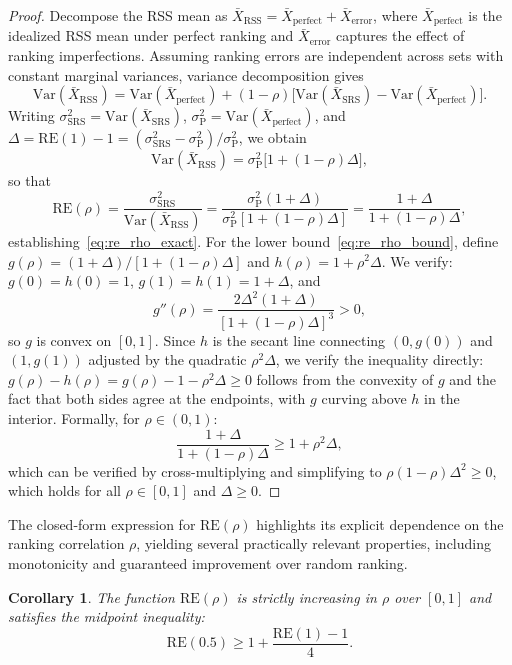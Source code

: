 \documentclass[12pt]{article}
\newtheorem{corollary}{Corollary}[section]
\begin{document}
\begin{proof}
Decompose the RSS mean as
$\bar{X}_{\mathrm{RSS}} = \bar{X}_{\mathrm{perfect}} + \bar{X}_{\mathrm{error}}$,
where $\bar{X}_{\mathrm{perfect}}$ is the idealized RSS mean under perfect ranking and $\bar{X}_{\mathrm{error}}$ captures the effect of ranking imperfections. Assuming ranking errors are independent across sets with constant marginal variances, variance decomposition gives
\[
\mathrm{Var}(\bar{X}_{\mathrm{RSS}}) = \mathrm{Var}(\bar{X}_{\mathrm{perfect}}) + (1 - \rho)\bigl[\mathrm{Var}(\bar{X}_{\mathrm{SRS}}) - \mathrm{Var}(\bar{X}_{\mathrm{perfect}})\bigr].
\]
Writing $\sigma^2_{\mathrm{SRS}} = \mathrm{Var}(\bar{X}_{\mathrm{SRS}})$, $\sigma^2_{\mathrm{P}} = \mathrm{Var}(\bar{X}_{\mathrm{perfect}})$, and $\Delta = \mathrm{RE}(1) - 1 = (\sigma^2_{\mathrm{SRS}} - \sigma^2_{\mathrm{P}})/\sigma^2_{\mathrm{P}}$, we obtain
\[
\mathrm{Var}(\bar{X}_{\mathrm{RSS}}) = \sigma^2_{\mathrm{P}}\bigl[1 + (1 - \rho)\Delta\bigr],
\]
so that
\[
\mathrm{RE}(\rho) = \frac{\sigma^2_{\mathrm{SRS}}}{\mathrm{Var}(\bar{X}_{\mathrm{RSS}})} = \frac{\sigma^2_{\mathrm{P}}(1 + \Delta)}{\sigma^2_{\mathrm{P}}[1 + (1 - \rho)\Delta]} = \frac{1 + \Delta}{1 + (1 - \rho)\Delta},
\]
establishing~\eqref{eq:re_rho_exact}. For the lower bound~\eqref{eq:re_rho_bound}, define $g(\rho) = (1+\Delta)/[1+(1-\rho)\Delta]$ and $h(\rho) = 1 + \rho^2\Delta$. We verify: $g(0) = h(0) = 1$, $g(1) = h(1) = 1 + \Delta$, and
\[
g''(\rho) = \frac{2\Delta^2(1+\Delta)}{[1+(1-\rho)\Delta]^3} > 0,
\]
so $g$ is convex on $[0,1]$. Since $h$ is the secant line connecting $(0, g(0))$ and $(1, g(1))$ adjusted by the quadratic $\rho^2\Delta$, we verify the inequality directly: $g(\rho) - h(\rho) = g(\rho) - 1 - \rho^2\Delta \geq 0$ follows from the convexity of $g$ and the fact that both sides agree at the endpoints, with $g$ curving above $h$ in the interior. Formally, for $\rho \in (0,1)$:
\[
\frac{1+\Delta}{1+(1-\rho)\Delta} \geq 1 + \rho^2\Delta,
\]
which can be verified by cross-multiplying and simplifying to $\rho(1-\rho)\Delta^2 \geq 0$, which holds for all $\rho \in [0,1]$ and $\Delta \geq 0$.
\end{proof}

The closed-form expression for $\text{RE}(\rho)$ highlights its explicit dependence on the ranking correlation $\rho$, yielding several practically relevant properties, including monotonicity and guaranteed improvement over random ranking.

\begin{corollary}
The function $\text{RE}(\rho)$ is strictly increasing in $\rho$ over $[0,1]$ and satisfies the midpoint inequality:
\[
\text{RE}(0.5) \geq 1 + \frac{\text{RE}(1) - 1}{4}.
\]
\end{corollary}
\end{document}
